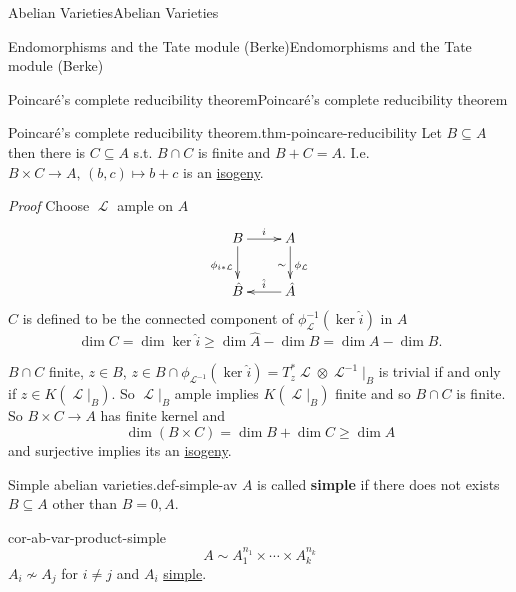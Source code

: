 \documentclass[10pt,]{book}
\makeatletter
\newcommand{\terminology}[1]{\textbf{#1}}
\renewcommand*{\proofname}{Proof}
\renewenvironment{proof}[1][\proofname]{\par
  \pushQED{\qed}%
  \normalfont \topsep6\p@\@plus6\p@\relax
  \trivlist
  \item\relax
    {\itshape
    #1\@addpunct{.}}\hspace\labelsep\ignorespaces
}{%
  \popQED\endtrivlist\@endpefalse
}
\numberwithin{equation}{section}
\newcommand{\sheaf}[1]{\operatorname{\mathcal{#1}}}
\makeatother
\begin{document}
\begin{chapterptx}{Abelian Varieties}{}{Abelian Varieties}{}{}
\begin{sectionptx}{Endomorphisms and the Tate module (Berke)}{}{Endomorphisms and the Tate module (Berke)}{}{}
\typeout{************************************************}
%
\begin{subsectionptx}{Poincaré's complete reducibility theorem}{}{Poincaré's complete reducibility theorem}{}{}\label{subsection-25}
\begin{theorem}{Poincaré's complete reducibility theorem.}{}{thm-poincare-reducibility}%
\hypertarget{p-209}{}%
Let \(B\subseteq A\) then there is \(C\subseteq A\) s.t. \(B \cap C\) is finite and \(B+C = A\). I.e. \(B\times C \to A,\,(b,c) \mapsto b+c\) is an \hyperref[def-supersing-isog-isog]{isogeny}.%
\end{theorem}
\begin{proof}\hypertarget{proof-38}{}
\hypertarget{p-210}{}%
Choose \(\sheaf L\) ample on \(A\)%
\begin{equation*}
\xymatrix{
B\ar[r]^i \ar[d]_{\phi_{i*\sheaf L}} & A \ar[d]_\sim^{\phi_{\sheaf L}} \\
\hat B & \hat A \ar[l]_{\hat i}
}
\end{equation*}
\(C\) is defined to be the connected component of \(\phi^{-1}_{\sheaf L}(\ker \hat i)\) in \(A\)%
\begin{equation*}
\dim C = \dim \ker \hat i \ge \dim \hat A - \dim \hat B = \dim A - \dim B\text{.}
\end{equation*}
%
\par
\hypertarget{p-211}{}%
\(B \cap C\) finite, \(z\in B\), \(z\in B\cap \phi_{\sheaf L^{-1}} (\ker \hat i) = T_z^* \sheaf L \otimes \sheaf L^{-1} |_B\) is trivial if and only if \(z\in K(\sheaf L|_B)\). So \(\sheaf L|_B\) ample implies \(K(\sheaf L|_B)\) finite and so \(B\cap C\) is finite. So \(B\times C \to A\) has finite kernel and%
\begin{equation*}
\dim (B\times C) = \dim B + \dim C \ge \dim A
\end{equation*}
and surjective implies its an \hyperref[def-supersing-isog-isog]{isogeny}.%
\end{proof}
\begin{definition}{Simple abelian varieties.}{def-simple-av}%
\hypertarget{p-212}{}%
\(A\) is called \terminology{simple} if there does not exists \(B\subseteq A\) other than \(B = 0,A\).%
\end{definition}
\begin{corollary}{}{}{cor-ab-var-product-simple}%
\hypertarget{p-213}{}%
%
\begin{equation*}
A \sim A_1^{n_1} \times \cdots \times A_k^{n_k}
\end{equation*}
\(A_i \not\sim A_j\) for \(i\ne j\) and \(A_i\) \hyperref[def-simple-av]{simple}.%

\end{corollary}
\end{subsectionptx}
\end{sectionptx}
\end{chapterptx}
\end{document}
